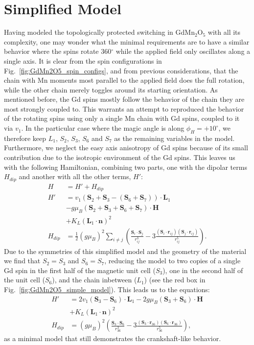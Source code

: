 \section{Simplified Model}
Having modeled the topologically protected switching in  GdMn$_2$O$_5$ with all its complexity, one may wonder what the minimal requirements are to have a similar behavior where the spins rotate 360$^\circ$ while the applied field only oscillates along a single axis.
It is clear from the spin configurations in Fig.~\ref{fig:GdMn2O5_spin_configs}, and from previous considerations, that the chain with Mn moments most parallel to the applied field does the full rotation, while the other chain merely toggles around its starting orientation. As mentioned before, the Gd spins mostly follow the behavior of the chain they are most strongly coupled to. This warrants an attempt to reproduced the behavior of the rotating spins using only a single Mn chain with Gd spins, coupled to it via $v_1$. 
In the particular case where the magic angle is along $\phi_H = +10^\circ$, we therefore keep $L_1$, $S_2$, $S_3$, $S_6$ and $S_7$ as the remaining variables in the model.
Furthermore, we neglect the easy axis anisotropy of Gd spins because of its small contribution due to the isotropic environment of the Gd spins.
This leaves us with the following Hamiltonian, combining two parts, one with the dipolar terms $H_{dip}$ and another with all the other terms, $H'$:
\begin{align}
	\label{eq:GdMn2O5_simple_model}
	H &= H' + H_{dip} \\
	H' &= v_1(\bm{S}_2 + \bm{S}_3 - (\bm{S}_6 + \bm{S}_7))\cdot\bm{L}_1 \nonumber\\
	&- g \mu_B (\bm{S}_2 + \bm{S}_3 + \bm{S}_6 + \bm{S}_7) \cdot \bm{H} \nonumber\\
	&+ K_L (\bm{L}_1 \cdot \bm{n})^2 \nonumber\\
	H_{dip} &= \frac{1}{2}(g \mu_B)^2\sum_{i\neq j}\left(\frac{\bm{S}_i\cdot \bm{S}_j}{r_{ij}^
3}-3\frac{(\bm{S}_i\cdot \bm{r}_{ij})(\bm{S}_j\cdot \bm{r}_{ij})}{r_{ij}^5}\right)\nonumber.
\end{align}
Due to the symmetries of this simplified model and the geometry of the material we find that $S_2 = S_3$ and $S_6 = S_7$, reducing the model to two copies of a single Gd spin in the first half of the magnetic unit cell ($S_3$), one in the second half of the unit cell ($S_6$), and the chain inbetween ($L_1$) (see the red box in Fig.~\ref{fig:GdMn2O5_simple_model}).
This leads us to the equations:
\begin{align}
	H' &= 2v_1(\bm{S}_3 - \bm{S}_6)\cdot\bm{L}_1 - 2g \mu_B (\bm{S}_3 + \bm{S}_6) 
\cdot \bm{H} \\
	&+ K_L (\bm{L}_1 \cdot \bm{n})^2 \nonumber\\
	H_{dip} &= (g \mu_B)^2\left(\frac{\bm{S}_3\cdot \bm{S}_6}{r_{36}^3}-3\frac{(\bm{S}_3\cdot \bm{r}_{36})(\bm{S}_6\cdot \bm{r}_{36})}{r_{36}^5}\right)\nonumber,
\end{align}
as a minimal model that still demonstrates the crankshaft-like behavior.

